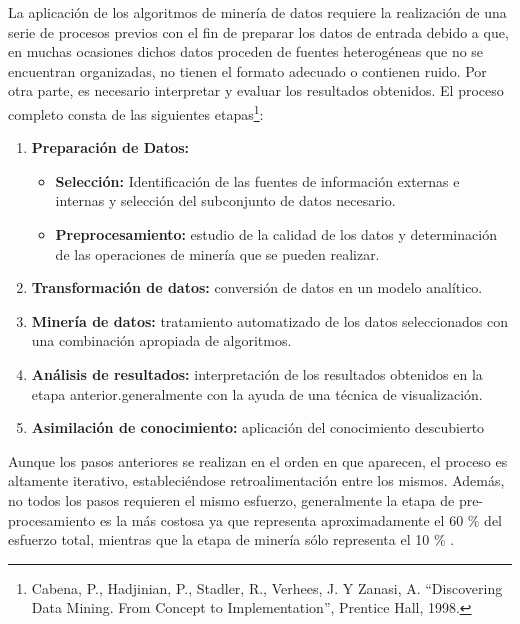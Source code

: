 \documentclass[a4paper,openright,12pt]{book}
\theoremstyle{definition}
\theoremstyle{remark}
\begin{document}
La aplicación de los algoritmos de minería de datos requiere la realización de una serie de procesos previos con el fin de  preparar los datos de entrada debido a que, en muchas ocasiones dichos datos proceden de fuentes heterogéneas que no se encuentran organizadas, no tienen el formato adecuado o
contienen ruido. Por otra parte, es necesario interpretar y evaluar los resultados obtenidos. El proceso completo consta de las siguientes etapas\footnote{Cabena, P., Hadjinian, P., Stadler, R., Verhees, J. Y Zanasi, A.
“Discovering Data Mining. From Concept to Implementation”, Prentice Hall, 1998.}:

\begin{enumerate}
\item \textbf{Preparación de Datos:}
	\begin{itemize}
		\item \textbf{Selección:} Identificación de las fuentes de información externas e internas y selección del subconjunto de datos necesario.
        \item \textbf{Preprocesamiento:} estudio de la calidad de los datos y determinación de las operaciones de minería que se pueden realizar.
\end{itemize}
\item \textbf{Transformación de datos:} conversión de datos en un modelo analítico.
\item \textbf{Minería de datos:} tratamiento automatizado de los datos seleccionados con una combinación apropiada de algoritmos.
\item \textbf{Análisis de resultados:} interpretación de los resultados obtenidos en la etapa anterior.generalmente con la ayuda de una técnica de visualización.
\item \textbf{Asimilación de conocimiento:} aplicación del conocimiento descubierto
\end{enumerate}

Aunque los pasos anteriores se realizan en el orden en que aparecen, el proceso es altamente iterativo, estableciéndose retroalimentación entre los mismos. Además, no todos los pasos requieren el mismo esfuerzo, generalmente la etapa de pre-procesamiento es la más costosa ya que representa aproximadamente el 60 \% del esfuerzo total, mientras que la etapa de minería sólo representa el 10 \% . 
\end{document}
